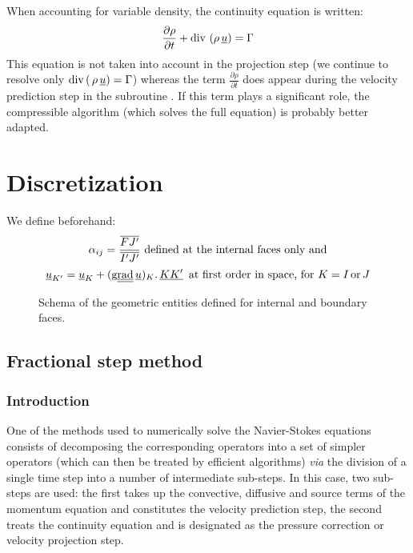 \begin{remark}
When accounting for variable density, the continuity equation is written:
$$\frac{\partial \rho}{\partial t} + \text{div}\,{\,(\rho\,\underline{u})} = \Gamma  $$
This equation is not taken into account in the projection step
(we continue to resolve only $\displaystyle \text{div}\,(\,{\rho\,\underline{u}}) = \Gamma$)
whereas the term $\displaystyle \frac{\partial \rho}{\partial t}$ does
appear during the velocity prediction step in the subroutine .
If this term plays a significant role, the \CS compressible algorithm
(which solves the full equation) is probably better adapted.
\end{remark}

\section*{Discretization}

We define beforehand:
%
\begin{equation}\notag
\displaystyle\alpha_{ij}=\frac{\overline{FJ'}}{\overline{I'J'}} \text{\ defined  at the internal faces only and}
\end{equation}
\begin{equation}\notag
\underline{u}_{K'} = \underline{u}_{K}+(\text{g}\underline{\underline{\text{rad}}}\,{\underline{u}})_K\text{.}\, \underline{KK'}\, \text{\
at first order in space, for ${K = I \,\text{or}\, J}$}
\end{equation}

\begin{figure}[!htbp]
\centering
{}%
\caption{\label{fig:internal_boundary_faces_schetches}Schema of the geometric entities defined for
internal and boundary faces.}
\end{figure}

\subsection*{Fractional step method}
\subsubsection*{Introduction}
One of the methods used to numerically solve the Navier-Stokes equations
consists of decomposing the corresponding operators into a set of simpler
operators (which can then be treated by efficient algorithms) \emph{via}
the division of a single time step into a number of intermediate sub-steps.
In this case, two sub-steps are used: the first takes up the convective,
diffusive and source terms of the momentum equation and constitutes the
velocity prediction step, the second treats the continuity equation and
is designated as the pressure correction or velocity projection step.

